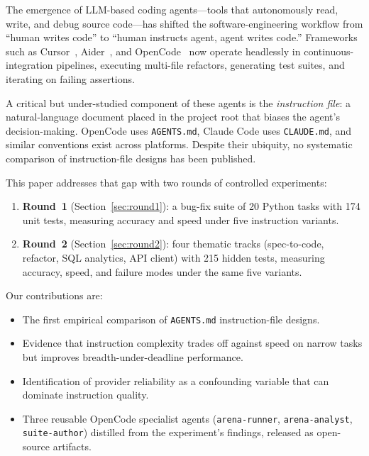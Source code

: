 \documentclass[journal]{IEEEtran}
\begin{document}
The emergence of LLM-based coding agents---tools that autonomously read, write, and
debug source code---has shifted the software-engineering workflow from ``human writes
code'' to ``human instructs agent, agent writes code.''
Frameworks such as Cursor~\cite{cursor}, Aider~\cite{aider}, and OpenCode~\cite{opencode}
now operate headlessly in continuous-integration pipelines, executing multi-file
refactors, generating test suites, and iterating on failing assertions.

A critical but under-studied component of these agents is the \emph{instruction file}:
a natural-language document placed in the project root that biases the agent's
decision-making.
OpenCode uses \texttt{AGENTS.md}, Claude Code uses \texttt{CLAUDE.md}, and
similar conventions exist across platforms.
Despite their ubiquity, no systematic comparison of instruction-file designs has
been published.

This paper addresses that gap with two rounds of controlled experiments:
\begin{enumerate}
    \item \textbf{Round~1} (Section~\ref{sec:round1}): a bug-fix suite of 20 Python
          tasks with 174 unit tests, measuring accuracy and speed under five
          instruction variants.
    \item \textbf{Round~2} (Section~\ref{sec:round2}): four thematic tracks
          (spec-to-code, refactor, SQL analytics, API client) with 215 hidden tests,
          measuring accuracy, speed, and failure modes under the same five variants.
\end{enumerate}

Our contributions are:
\begin{itemize}
    \item The first empirical comparison of \texttt{AGENTS.md} instruction-file designs.
    \item Evidence that instruction complexity trades off against speed on narrow tasks
          but improves breadth-under-deadline performance.
    \item Identification of provider reliability as a confounding variable that can
          dominate instruction quality.
    \item Three reusable OpenCode specialist agents (\texttt{arena-runner},
          \texttt{arena-analyst}, \texttt{suite-author}) distilled from the
          experiment's findings, released as open-source artifacts.
\end{itemize}
\end{document}
